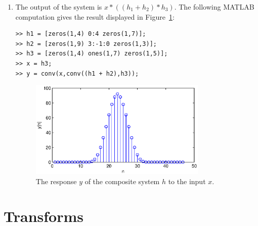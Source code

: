 \documentclass[11pt]{article}
\begin{document}
\begin{enumerate}[1.]
\begin{enumerate}[1.]
\item
The output of the system is $x * ((h_1 + h_2) * h_3)$. The following MATLAB
computation gives the result displayed in Figure~\ref{fig:2.2.2}:
\begin{verbatim}
>> h1 = [zeros(1,4) 0:4 zeros(1,7)];  
>> h2 = [zeros(1,9) 3:-1:0 zeros(1,3)];
>> h3 = [zeros(1,4) ones(1,7) zeros(1,5)];
>> x = h3;
>> y = conv(x,conv((h1 + h2),h3));
\end{verbatim}
\vspace{-0.2in}
\begin{figure}[h]
\begin{center}
\includegraphics[width=0.8\textwidth]{2.2.2.eps}
\end{center}
\vspace{-0.2in}
\caption{The response $y$ of the composite system $h$ to the input $x$.}
\label{fig:2.2.2}
\end{figure}

\end{enumerate}
\end{enumerate}

\section{Transforms}
\end{document}
